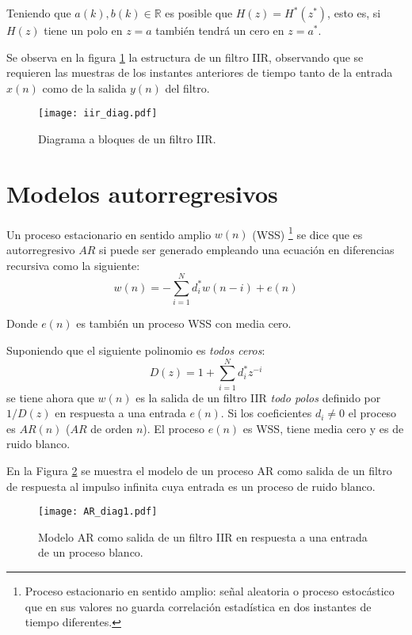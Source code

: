 Teniendo que $a(k), b(k) \in \mathbb{R}$ es posible que $H(z)=H^*(z^*)$, esto es, si $H(z)$ tiene un polo en $z=a$ también tendrá un cero en $z=a^*$. 

Se observa en la figura \ref{iir_diag} la estructura de un filtro IIR, observando que se requieren las muestras de los instantes anteriores de tiempo tanto de la entrada $x(n)$ como de la salida $y(n)$ del filtro. 
\begin{figure} [ht]
  \centering
  \texttt{[image: iir\_diag.pdf]}
  \caption{Diagrama a bloques de un filtro IIR.}
  \label{iir_diag}
\end{figure}

\section{Modelos autorregresivos}
Un proceso estacionario en sentido amplio $w(n)$ (WSS) \footnote{Proceso estacionario en sentido amplio: señal aleatoria o proceso estocástico que en sus valores no guarda correlación estadística en dos instantes de tiempo diferentes.} \cite[]{Papoulis1984} se dice que es autorregresivo $AR$ si puede ser generado empleando una ecuación en diferencias recursiva como la siguiente:
\begin{equation}\label{ar}
w(n) = -\sum_{i=1}^N d_i^* w(n-i)+e(n)
\end{equation}

Donde $e(n)$ es también un proceso WSS con media cero.

Suponiendo que el siguiente polinomio es \emph{todos ceros}:
\begin{equation}\label{ar_coef}
D(z) = 1+\sum_{i=1}^N d_i^* z^{-i}
\end{equation}
se tiene ahora que $w(n)$ es la salida de un filtro IIR \emph{todo polos} definido por $1/D(z)$ en respuesta a una entrada $e(n)$. Si los coeficientes $d_i \ne 0$ el proceso es $AR(n)$ ($AR$ de orden $n$). El proceso $e(n)$ es WSS, tiene media cero y es de ruido blanco.

En la Figura \ref{AR_diag} se muestra el modelo de un proceso AR como salida de un filtro de respuesta al impulso infinita cuya entrada es un proceso de ruido blanco.

\begin{figure} [h!]\label{AR_diag1}
  \centering
  \texttt{[image: AR\_diag1.pdf]}
  \caption{Modelo AR como salida de un filtro IIR en respuesta a una entrada de un proceso blanco.}
  \label{AR_diag}
\end{figure}

